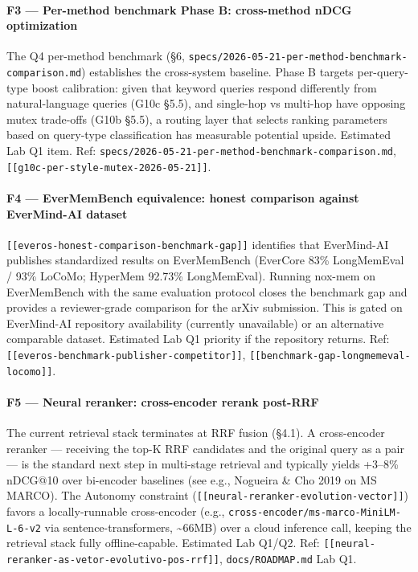 \documentclass[
]{article}
\begin{document}
\paragraph{F3 --- Per-method benchmark Phase B: cross-method nDCG
optimization}\label{f3-per-method-benchmark-phase-b-cross-method-ndcg-optimization}

The Q4 per-method benchmark (§6,
\texttt{specs/2026-05-21-per-method-benchmark-comparison.md})
establishes the cross-system baseline. Phase B targets per-query-type
boost calibration: given that keyword queries respond differently from
natural-language queries (G10c §5.5), and single-hop vs multi-hop have
opposing mutex trade-offs (G10b §5.5), a routing layer that selects
ranking parameters based on query-type classification has measurable
potential upside. Estimated Lab Q1 item. Ref:
\texttt{specs/2026-05-21-per-method-benchmark-comparison.md},
\texttt{{[}{[}g10c-per-style-mutex-2026-05-21{]}{]}}.

\paragraph{F4 --- EverMemBench equivalence: honest comparison against
EverMind-AI
dataset}\label{f4-evermembench-equivalence-honest-comparison-against-evermind-ai-dataset}

\texttt{{[}{[}everos-honest-comparison-benchmark-gap{]}{]}} identifies
that EverMind-AI publishes standardized results on EverMemBench
(EverCore 83\% LongMemEval / 93\% LoCoMo; HyperMem 92.73\% LongMemEval).
Running nox-mem on EverMemBench with the same evaluation protocol closes
the benchmark gap and provides a reviewer-grade comparison for the arXiv
submission. This is gated on EverMind-AI repository availability
(currently unavailable) or an alternative comparable dataset. Estimated
Lab Q1 priority if the repository returns. Ref:
\texttt{{[}{[}everos-benchmark-publisher-competitor{]}{]}},
\texttt{{[}{[}benchmark-gap-longmemeval-locomo{]}{]}}.

\paragraph{F5 --- Neural reranker: cross-encoder rerank
post-RRF}\label{f5-neural-reranker-cross-encoder-rerank-post-rrf}

The current retrieval stack terminates at RRF fusion (§4.1). A
cross-encoder reranker --- receiving the top-K RRF candidates and the
original query as a pair --- is the standard next step in multi-stage
retrieval and typically yields +3--8\% nDCG@10 over bi-encoder baselines
(see e.g., Nogueira \& Cho 2019 on MS MARCO). The Autonomy constraint
(\texttt{{[}{[}neural-reranker-evolution-vector{]}{]}}) favors a
locally-runnable cross-encoder (e.g.,
\texttt{cross-encoder/ms-marco-MiniLM-L-6-v2} via sentence-transformers,
\textasciitilde66MB) over a cloud inference call, keeping the retrieval
stack fully offline-capable. Estimated Lab Q1/Q2. Ref:
\texttt{{[}{[}neural-reranker-as-vetor-evolutivo-pos-rrf{]}{]}},
\texttt{docs/ROADMAP.md} Lab Q1.
\end{document}
